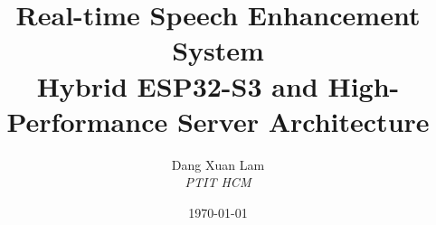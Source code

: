 \documentclass[11pt,a4paper,final]{article}
\title{\textbf{Real-time Speech Enhancement System\\ Hybrid ESP32-S3 and High-Performance Server Architecture}}
\author{Dang Xuan Lam \\ \textit{PTIT HCM}}
\date{\today}
\begin{document}
\maketitle



\newpage
\tableofcontents
\newpage


\newpage

\newpage

\newpage

\newpage


\newpage
\nocite{*}


\end{document}
